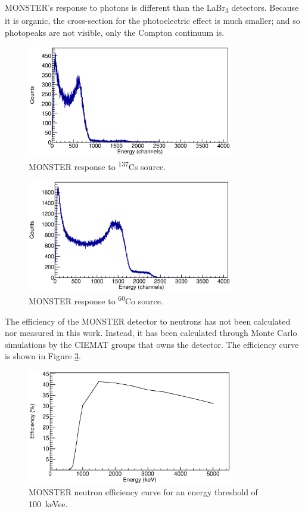 \documentclass[a4paper,12pt]{report}
\begin{document}
MONSTER's response to photons is different than the LaBr\textsubscript{3} detectors.
Because it is organic, the cross-section for the photoelectric effect is much smaller; and so photopeaks are not visible, only the Compton continuum is.

\begin{figure}[H]
	\centering
	\includegraphics[width=0.80\textwidth]{monster_cs_calibration.eps}
	\caption{MONSTER response to \textsuperscript{137}Cs source.}
	\label{monster_cs_calibration}
\end{figure}

\begin{figure}[H]
	\centering
	\includegraphics[width=0.80\textwidth]{monster_co_calibration.eps}
	\caption{MONSTER response to \textsuperscript{60}Co source.}
	\label{monster_co_calibration}
\end{figure}

The efficiency of the MONSTER detector to neutrons has not been calculated nor measured in this work.
Instead, it has been calculated through Monte Carlo simulations by the CIEMAT groups that owns the detector.
The efficiency curve is shown in Figure \ref{monster_efficiency}.

\begin{figure}[H]
	\centering
	\includegraphics[width=0.80\textwidth]{monster_efficiency.eps}
	\caption{MONSTER neutron efficiency curve for an energy threshold of \qty{100}{keVee}.}
	\label{monster_efficiency}
\end{figure}
\end{document}
